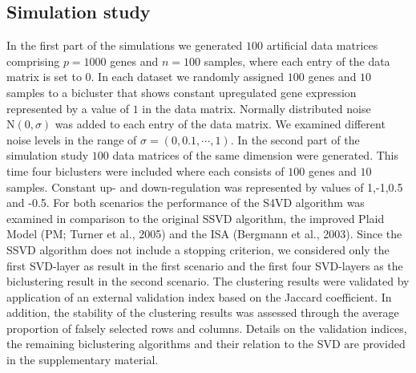 \documentclass{bioinfo}
\begin{document}
\subsection{Simulation study}
In the first part of the simulations we generated $100$ artificial data matrices comprising $p=1000$ genes and $n=100$ samples, where each entry of the data matrix is set to $0$. In each dataset we randomly assigned $100$ genes and $10$ samples to a bicluster that shows constant upregulated gene expression represented by a value of $1$ in the data matrix. Normally distributed noise $\text{N}(0,\sigma)$ was added to each entry of the data matrix. We examined different noise levels in the range of $\sigma=(0,0.1,\cdots,1)$. In the second part of the simulation study $100$ data matrices of the same dimension were generated. This time four biclusters were included where each consists of $100$ genes and $10$ samples. Constant up- and down-regulation was represented by values of 1,-1,0.5 and -0.5. For both scenarios the performance of the S4VD algorithm was examined in comparison to the original SSVD algorithm, the improved Plaid Model (PM; Turner et al., 2005) and the ISA (Bergmann et al., 2003). Since the SSVD algorithm does not include a stopping criterion, we considered only the first SVD-layer as result in the first scenario and the first four SVD-layers as the biclustering result in the second scenario. The clustering results were validated by application of an external validation index based on the Jaccard coefficient. In addition, the stability of the clustering results was assessed through the average proportion of falsely selected rows and columns. Details on the validation indices, the remaining biclustering algorithms and their relation to the SVD are provided in the supplementary material. 
\end{document}
